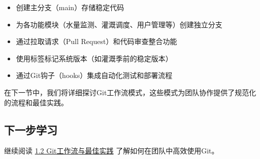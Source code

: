 \begin{itemize}
\tightlist
\item
  创建主分支（main）存储稳定代码
\item
  为各功能模块（水量监测、灌溉调度、用户管理等）创建独立分支
\item
  通过拉取请求（Pull Request）和代码审查整合功能
\item
  使用标签标记系统版本（如灌溉季前的稳定版本）
\item
  通过Git钩子（hooks）集成自动化测试和部署流程
\end{itemize}

在下一节中，我们将详细探讨Git工作流模式，这些模式为团队协作提供了规范化的流程和最佳实践。

\subsection{下一步学习}\label{ux4e0bux4e00ux6b65ux5b66ux4e60}

继续阅读 \href{section03-01-02.md}{1.2 Git工作流与最佳实践}
了解如何在团队中高效使用Git。
